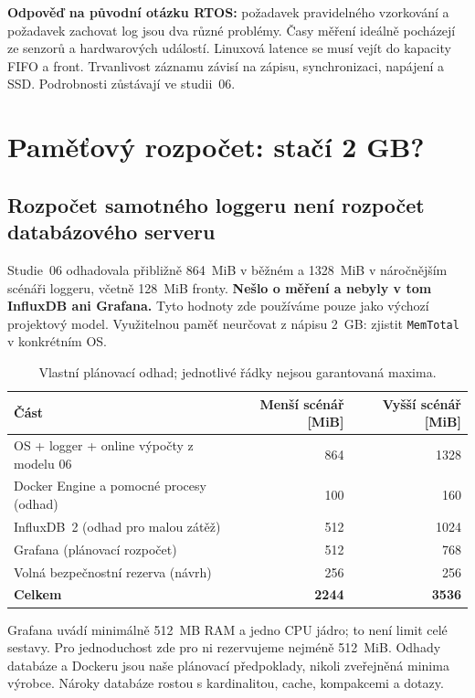 \documentclass[11pt,a4paper]{article}
\begin{document}
\textbf{Odpověď na původní otázku RTOS:} požadavek pravidelného vzorkování a požadavek zachovat log jsou dva různé problémy. Časy měření ideálně pocházejí ze senzorů a hardwarových událostí. Linuxová latence se musí vejít do kapacity FIFO a front. Trvanlivost záznamu závisí na zápisu, synchronizaci, napájení a SSD. Podrobnosti zůstávají ve studii~06.\cite{studie06,fsync}

\clearpage
\section{Paměťový rozpočet: stačí 2 GB?}
\subsection{Rozpočet samotného loggeru není rozpočet databázového serveru}
Studie~06 odhadovala přibližně 864~MiB v běžném a 1328~MiB v náročnějším scénáři loggeru, včetně 128~MiB fronty. \textbf{Nešlo o měření a nebyly v tom InfluxDB ani Grafana.} Tyto hodnoty zde používáme pouze jako výchozí projektový model. Využitelnou paměť neurčovat z nápisu 2~GB: zjistit \texttt{MemTotal} v konkrétním OS.\cite{studie06}

\begin{table}[htbp]\centering\small
\caption{Vlastní plánovací odhad; jednotlivé řádky nejsou garantovaná maxima.}
\par\noindent\begin{tabularx}{\textwidth}{Yrr}
\toprule Část & Menší scénář [MiB] & Vyšší scénář [MiB]\\\midrule
OS + logger + online výpočty z modelu 06 & 864 & 1328\\
Docker Engine a pomocné procesy (odhad) & 100 & 160\\
InfluxDB~2 (odhad pro malou zátěž) & 512 & 1024\\
Grafana (plánovací rozpočet) & 512 & 768\\
Volná bezpečnostní rezerva (návrh) & 256 & 256\\\midrule
\textbf{Celkem} & \textbf{2244} & \textbf{3536}\\
\bottomrule
\end{tabularx}\par\end{table}

Grafana uvádí minimálně 512~MB RAM a jedno CPU jádro; to není limit celé sestavy. Pro jednoduchost zde pro ni rezervujeme nejméně 512~MiB. Odhady databáze a Dockeru jsou naše plánovací předpoklady, nikoli zveřejněná minima výrobce. Nároky databáze rostou s kardinalitou, cache, kompakcemi a dotazy.\cite{grafana-install,influx-schema}
\end{document}
